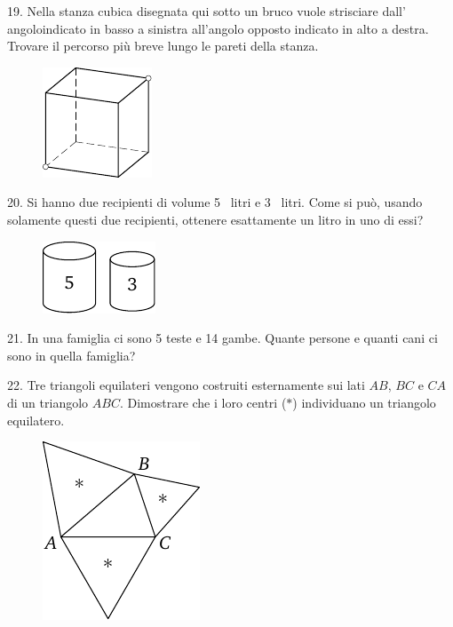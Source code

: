 \begin{problem}{19.}
	Nella stanza cubica disegnata qui sotto un bruco vuole strisciare dall' angoloindicato in basso a sinistra  all’angolo opposto indicato in alto a destra. Trovare il  percorso più breve lungo le pareti della stanza.
	\begin{figure}
		\includegraphics{resources/taskbook-3}
	\end{figure}
\end{problem}

\begin{problem}{20.}
	Si hanno due recipienti di volume 5~ litri e 3~ litri. Come si può, usando solamente questi due recipienti, ottenere esattamente un litro in uno di essi?
	\begin{figure}
		\includegraphics{resources/taskbook-4}
	\end{figure}
\end{problem}

\begin{problem}{21.}
	In una famiglia ci sono 5 teste e 14 gambe. Quante persone e quanti cani ci sono in quella famiglia?
\end{problem}

\begin{problem}{22.}
	Tre triangoli equilateri vengono costruiti esternamente sui lati $AB$, $BC$ e $CA$ di un triangolo $ABC$.
	Dimostrare che i loro centri ($*$) individuano un triangolo equilatero.
	\begin{figure}
		\includegraphics{resources/taskbook-6}
	\end{figure}
\end{problem}

